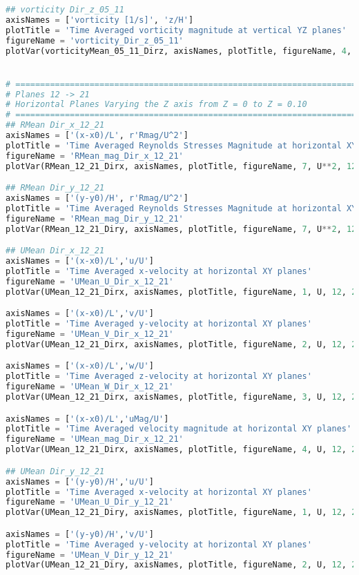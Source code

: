 \begin{lstlisting}[language=python]
## vorticity Dir_z_05_11
axisNames = ['vorticity [1/s]', 'z/H']
plotTitle = 'Time Averaged vorticity magnitude at vertical YZ planes'
figureName = 'vorticity_Dir_z_05_11'
plotVar(vorticityMean_05_11_Dirz, axisNames, plotTitle, figureName, 4, 1, 5, 11)


# =============================================================================
# Planes 12 -> 21
# Horizontal Planes Varying the Z axis from Z = 0 to Z = 0.10
# =============================================================================
## RMean Dir_x_12_21
axisNames = ['(x-x0)/L', r'Rmag/U^2']
plotTitle = 'Time Averaged Reynolds Stresses Magnitude at horizontal XY planes'
figureName = 'RMean_mag_Dir_x_12_21'
plotVar(RMean_12_21_Dirx, axisNames, plotTitle, figureName, 7, U**2, 12, 21)

## RMean Dir_y_12_21
axisNames = ['(y-y0)/H', r'Rmag/U^2']
plotTitle = 'Time Averaged Reynolds Stresses Magnitude at horizontal XY planes'
figureName = 'RMean_mag_Dir_y_12_21'
plotVar(RMean_12_21_Diry, axisNames, plotTitle, figureName, 7, U**2, 12, 21)

## UMean Dir_x_12_21
axisNames = ['(x-x0)/L','u/U']
plotTitle = 'Time Averaged x-velocity at horizontal XY planes'
figureName = 'UMean_U_Dir_x_12_21'
plotVar(UMean_12_21_Dirx, axisNames, plotTitle, figureName, 1, U, 12, 21)

axisNames = ['(x-x0)/L','v/U']
plotTitle = 'Time Averaged y-velocity at horizontal XY planes'
figureName = 'UMean_V_Dir_x_12_21'
plotVar(UMean_12_21_Dirx, axisNames, plotTitle, figureName, 2, U, 12, 21)

axisNames = ['(x-x0)/L','w/U']
plotTitle = 'Time Averaged z-velocity at horizontal XY planes'
figureName = 'UMean_W_Dir_x_12_21'
plotVar(UMean_12_21_Dirx, axisNames, plotTitle, figureName, 3, U, 12, 21)

axisNames = ['(x-x0)/L','uMag/U']
plotTitle = 'Time Averaged velocity magnitude at horizontal XY planes'
figureName = 'UMean_mag_Dir_x_12_21'
plotVar(UMean_12_21_Dirx, axisNames, plotTitle, figureName, 4, U, 12, 21)

## UMean Dir_y_12_21
axisNames = ['(y-y0)/H','u/U']
plotTitle = 'Time Averaged x-velocity at horizontal XY planes'
figureName = 'UMean_U_Dir_y_12_21'
plotVar(UMean_12_21_Diry, axisNames, plotTitle, figureName, 1, U, 12, 21)

axisNames = ['(y-y0)/H','v/U']
plotTitle = 'Time Averaged y-velocity at horizontal XY planes'
figureName = 'UMean_V_Dir_y_12_21'
plotVar(UMean_12_21_Diry, axisNames, plotTitle, figureName, 2, U, 12, 21)


\end{lstlisting}

